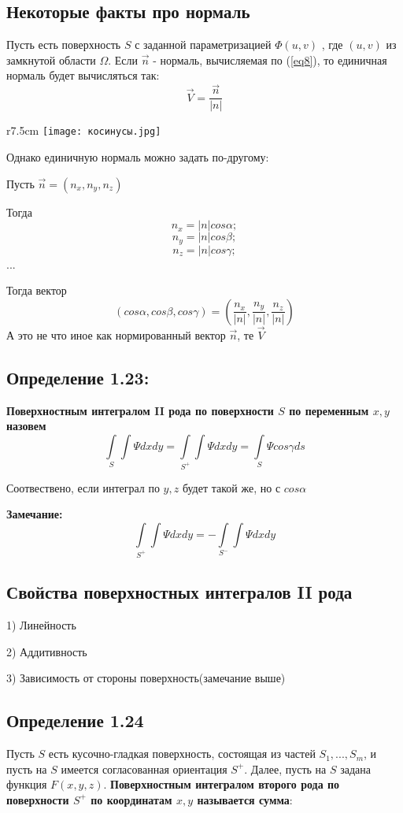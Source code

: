 \documentclass[12pt]{article}
\begin{document}
\subsection*{Некоторые факты про нормаль}

	Пусть есть поверхность $S$ с заданной параметризацией $\Phi(u,v)$ , где $(u,v)$ из замкнутой области $\Omega$. Если $\vec{n}$ - нормаль, вычисляемая по (\ref{eq8}), то единичная нормаль будет вычисляться так:
	$$\vec{V} = \frac{\vec{n}}{|n|}$$

\begin{wrapfigure}{r}{7.5cm}
\texttt{[image: косинусы.jpg]}
\end{wrapfigure}	
	
Однако единичную нормаль можно задать по-другому:

Пусть $\vec{n} = (n_x , n_y , n_z)$

Тогда 
$$
n_x = |n|cos\alpha;
$$
$$
n_y = |n|cos\beta;
$$
$$
n_z = |n|cos\gamma;
$$
...

Тогда вектор 
$$
(cos\alpha , cos\beta , cos\gamma) = (\frac{n_x}{|n|} , \frac{n_y}{|n|} , \frac{n_z}{|n|})
$$
А это не что иное как нормированный вектор $\vec{n}$, те $\vec{V}$

\subsection*{Определение 1.23:}\label{eq9}
\textbf{	Поверхностным интегралом II рода по поверхности $S$ по переменным $x,y$ назовем}
$$
\int\limits_{S}\int \Psi dxdy 
=
\int\limits_{S^+}\int \Psi dxdy 
=
\int\limits_{S} \Psi cos\gamma ds 
$$
	
Соотвествено, если интеграл по $y , z$ будет такой же, но с $cos\alpha$

\textbf{Замечание:}
$$
\int\limits_{S^+}\int \Psi dxdy 
=
-\int\limits_{S^-}\int \Psi dxdy
$$

\subsection{Свойства поверхностных интегралов II рода}
	1) Линейность
	
	2) Аддитивность
	
	3) Зависимость от стороны поверхность(замечание выше)

\subsection*{Определение 1.24}
	Пусть $S$ есть кусочно-гладкая поверхность, состоящая из частей $S_1,...,
S_m$, и пусть на $S$ имеется согласованная ориентация $S^+$. Далее, пусть на $S$
задана функция $F(x, y, z)$. \textbf{Поверхностным интегралом второго рода по поверхности $S^+$ по координатам $x, y$ называется сумма}:
\end{document}
